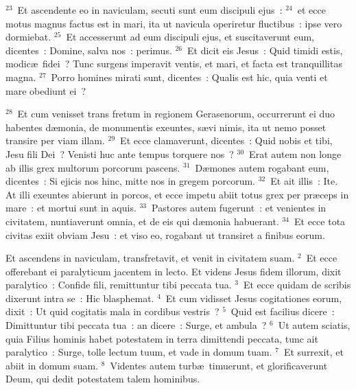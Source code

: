 ${}^{23}$~Et ascendente eo in naviculam, secuti sunt eum discipuli ejus~:
${}^{24}$~et ecce motus magnus factus est in mari, ita ut navicula operiretur fluctibus~: ipse vero dormiebat.
${}^{25}$~Et accesserunt ad eum discipuli ejus, et suscitaverunt eum, dicentes~: Domine, salva nos~: perimus.
${}^{26}$~Et dicit eis Jesus~: Quid timidi estis, modic\ae\ fidei~? Tunc surgens imperavit ventis, et mari, et facta est tranquillitas magna.
${}^{27}$~Porro homines mirati sunt, dicentes~: Qualis est hic, quia venti et mare obediunt ei~?


${}^{28}$~Et cum venisset trans fretum in regionem Gerasenorum, occurrerunt ei duo habentes d\ae monia, de monumentis exeuntes, s\ae vi nimis, ita ut nemo posset transire per viam illam.
${}^{29}$~Et ecce clamaverunt, dicentes~: Quid nobis et tibi, Jesu fili Dei~? Venisti huc ante tempus torquere nos~?
${}^{30}$~Erat autem non longe ab illis grex multorum porcorum pascens.
${}^{31}$~D\ae mones autem rogabant eum, dicentes~: Si ejicis nos hinc, mitte nos in gregem porcorum.
${}^{32}$~Et ait illis~: Ite. At illi exeuntes abierunt in porcos, et ecce impetu abiit totus grex per pr\ae ceps in mare~: et mortui sunt in aquis.
${}^{33}$~Pastores autem fugerunt~: et venientes in civitatem, nuntiaverunt omnia, et de eis qui d\ae monia habuerant.
${}^{34}$~Et ecce tota civitas exiit obviam Jesu~: et viso eo, rogabant ut transiret a finibus eorum.

\lettrine[lines=10,image=true,loversize=0.05,lraise=-0.03]{E}{}t ascendens in naviculam, transfretavit, et venit in civitatem suam.
${}^{2}$~Et ecce offerebant ei paralyticum jacentem in lecto. Et videns Jesus fidem illorum, dixit paralytico~: Confide fili, remittuntur tibi peccata tua.
${}^{3}$~Et ecce quidam de scribis dixerunt intra se~: Hic blasphemat.
${}^{4}$~Et cum vidisset Jesus cogitationes eorum, dixit~: Ut quid cogitatis mala in cordibus vestris~?
${}^{5}$~Quid est facilius dicere~: Dimittuntur tibi peccata tua~: an dicere~: Surge, et ambula~?
${}^{6}$~Ut autem sciatis, quia Filius hominis habet potestatem in terra dimittendi peccata, tunc ait paralytico~: Surge, tolle lectum tuum, et vade in domum tuam.
${}^{7}$~Et surrexit, et abiit in domum suam.
${}^{8}$~Videntes autem turb\ae\ timuerunt, et glorificaverunt Deum, qui dedit potestatem talem hominibus.


